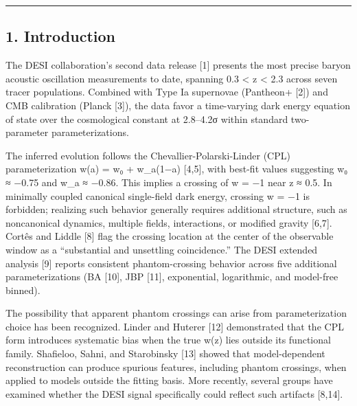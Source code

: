 \begin{center}\rule{0.5\linewidth}{0.5pt}\end{center}

\subsection{1. Introduction}\label{introduction}

The DESI collaboration's second data release {[}1{]} presents the most
precise baryon acoustic oscillation measurements to date, spanning 0.3
\textless{} z \textless{} 2.3 across seven tracer populations. Combined
with Type Ia supernovae (Pantheon+ {[}2{]}) and CMB calibration (Planck
{[}3{]}), the data favor a time-varying dark energy equation of state
over the cosmological constant at 2.8--4.2σ within standard
two-parameter parameterizations.

The inferred evolution follows the Chevallier-Polarski-Linder (CPL)
parameterization w(a) = w₀ + w\_a(1−a) {[}4,5{]}, with best-fit values
suggesting w₀ ≈ −0.75 and w\_a ≈ −0.86. This implies a crossing of w =
−1 near z ≈ 0.5. In minimally coupled canonical single-field dark
energy, crossing w = −1 is forbidden; realizing such behavior generally
requires additional structure, such as noncanonical dynamics, multiple
fields, interactions, or modified gravity {[}6,7{]}. Cortês and Liddle
{[}8{]} flag the crossing location at the center of the observable
window as a ``substantial and unsettling coincidence.'' The DESI
extended analysis {[}9{]} reports consistent phantom-crossing behavior
across five additional parameterizations (BA {[}10{]}, JBP {[}11{]},
exponential, logarithmic, and model-free binned).

The possibility that apparent phantom crossings can arise from
parameterization choice has been recognized. Linder and Huterer {[}12{]}
demonstrated that the CPL form introduces systematic bias when the true
w(z) lies outside its functional family. Shafieloo, Sahni, and
Starobinsky {[}13{]} showed that model-dependent reconstruction can
produce spurious features, including phantom crossings, when applied to
models outside the fitting basis. More recently, several groups have
examined whether the DESI signal specifically could reflect such
artifacts {[}8,14{]}.

